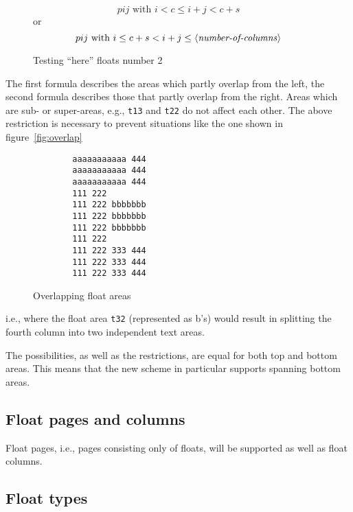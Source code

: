 \documentclass[twocolumn]{article}
\newcommand\meta[1]{\mbox{$\langle$\textit{#1}$\rangle$}}
\begin{document}
\begin{figure}[h]
\begin{minipage}{\columnwidth}
\vspace*{-2\baselineskip}
\tiny %
\[
   pij  \textrm{ with }   i < c \leq i+j < c+s
\]
or
\[
   pij  \textrm{ with }   i \leq c+s < i+j \leq 
                            \mbox{\meta{number-of-columns}}
\]
\end{minipage}
\caption{Testing ``here'' floats number 2}
\end{figure}

The first formula describes the areas which partly overlap from the
left, the second formula describes those that partly overlap from
the right. Areas which are sub- or super-areas, e.g., \texttt{t13}
and \texttt{t22} do not affect each other. The above restriction is
necessary to prevent situations like the one shown in
figure~\vref{fig:overlap}
%
\begin{figure}
\footnotesize
\caption{Overlapping float areas}\label{fig:overlap}
\begin{minipage}{.6\columnwidth}
\begin{verbatim}
        aaaaaaaaaaa 444
        aaaaaaaaaaa 444
        aaaaaaaaaaa 444
        111 222
        111 222 bbbbbbb
        111 222 bbbbbbb
        111 222 bbbbbbb
        111 222
        111 222 333 444
        111 222 333 444
        111 222 333 444
\end{verbatim}
\end{minipage}
\end{figure}
%
i.e., where the float area \texttt{t32} (represented as b's) would
result in splitting the fourth column into two independent text areas.


The possibilities, as well as the restrictions, are equal for both top
and bottom areas. This means that the new scheme in particular
supports spanning bottom areas.

\ORspecial\ShowGridfalse

\subsection{Float pages and columns}

Float pages, i.e., pages consisting only of floats, will be supported
as well as float columns.


\subsection{Float types}
\end{document}
